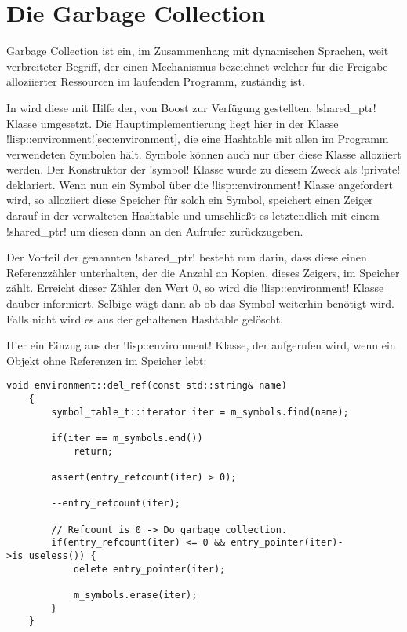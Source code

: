 \section{Die Garbage Collection}
\label{sec:shared_ptr}

Garbage Collection ist ein, im Zusammenhang mit dynamischen Sprachen,
weit verbreiteter Begriff, der
einen Mechanismus bezeichnet welcher für die Freigabe alloziierter
Ressourcen im laufenden Programm, zuständig
ist.

In \projectname{} wird diese mit Hilfe der, von Boost zur Verfügung
gestellten, !shared_ptr! Klasse umgesetzt.
Die Hauptimplementierung liegt hier in der Klasse !lisp::environment!\ref{sec:environment},
die eine Hashtable mit allen
im Programm verwendeten Symbolen hält.
Symbole können auch nur über diese Klasse alloziiert werden.
Der Konstruktor der !symbol! Klasse wurde zu diesem Zweck als !private! deklariert.
Wenn nun ein Symbol über die !lisp::environment! Klasse angefordert wird,
so alloziiert diese Speicher für solch ein Symbol,
speichert einen Zeiger darauf in der verwalteten Hashtable
und umschließt es letztendlich mit einem !shared_ptr!
um diesen dann an den Aufrufer zurückzugeben.

Der Vorteil der genannten !shared_ptr! besteht nun darin,
dass diese einen Referenzzähler unterhalten,
der die Anzahl an Kopien, dieses Zeigers, im Speicher zählt.
Erreicht dieser Zähler den Wert 0, so
wird die !lisp::environment! Klasse daüber informiert.
Selbige wägt dann ab ob das Symbol weiterhin benötigt
wird. Falls nicht wird es aus der gehaltenen Hashtable gelöscht.

Hier ein Einzug aus der !lisp::environment! Klasse, der aufgerufen wird, wenn
ein Objekt ohne Referenzen im Speicher lebt:

\begin{lstlisting}[caption={Symbolbeseitigung}, label=lst:del_ref]
    void environment::del_ref(const std::string& name) 
    {
        symbol_table_t::iterator iter = m_symbols.find(name);

        if(iter == m_symbols.end())
            return;

        assert(entry_refcount(iter) > 0);

        --entry_refcount(iter);

        // Refcount is 0 -> Do garbage collection.
        if(entry_refcount(iter) <= 0 && entry_pointer(iter)->is_useless()) {
            delete entry_pointer(iter);

            m_symbols.erase(iter);
        }
    }
\end{lstlisting}


